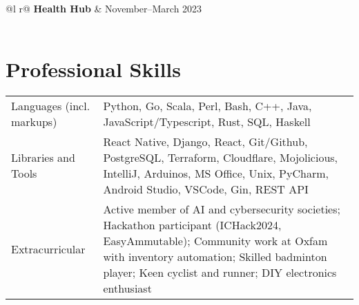 \documentclass[a4paper,10pt]{article}
\begin{document}
\begin{tabularx}{\linewidth}{ @{}l r@{} }
    \textbf{Health Hub} & \hfill November--March 2023 \\[3.75pt]
                                                     \\
\end{tabularx}


\section{Professional Skills}
\begin{tabularx}{\linewidth}{@{}l X@{}}
    Languages (incl. markups) & \normalsize{Python, Go, Scala, Perl, Bash, C++, Java, JavaScript/Typescript, Rust, SQL, Haskell}                                                                                                                                                  \\
    Libraries and Tools       & \normalsize{React Native, Django, React, Git/Github, PostgreSQL, Terraform, Cloudflare, Mojolicious, IntelliJ, Arduinos, MS Office, Unix, PyCharm, Android Studio, VSCode, Gin, REST API}                                                         \\
    Extracurricular           & \normalsize{Active member of AI and cybersecurity societies; Hackathon participant (ICHack2024, EasyAmmutable); Community work at Oxfam with inventory automation; Skilled badminton player; Keen cyclist and runner; DIY electronics enthusiast} \\
\end{tabularx}
\end{document}
